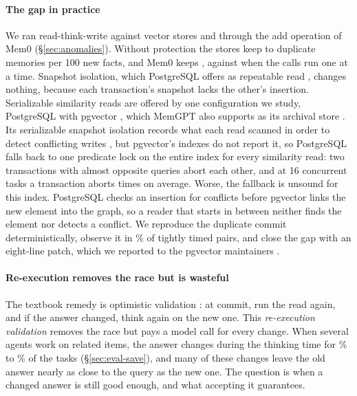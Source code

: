 \documentclass[sigconf, nonacm, review]{acmart}
\begin{document}
\paragraph{The gap in practice}
We ran read-think-write against  vector stores and
through the add operation of Mem0 (\S\ref{sec:anomalies}). Without
protection the stores keep  to 
duplicate memories per 100 new facts, and Mem0 keeps
, against  when the calls
run one at a time. Snapshot isolation, which PostgreSQL offers as repeatable read
\cite{DBLP:journals/pvldb/PortsG12}, changes nothing, because each
transaction's snapshot lacks the other's insertion. Serializable
similarity reads are offered by one configuration we study,
PostgreSQL with pgvector \cite{pgvector}, which MemGPT also
supports as its archival store \cite{DBLP:journals/corr/abs-2310-08560}. Its
serializable snapshot isolation records what each read scanned in order
to detect conflicting writes
\cite{DBLP:conf/sigmod/CahillRF08,DBLP:journals/pvldb/PortsG12}, but
pgvector's indexes do not report it, so PostgreSQL falls back to one
predicate lock on the entire index for every similarity read: two
transactions with almost opposite queries abort each other, and at
16 concurrent tasks a transaction aborts  times on average. Worse, the
fallback is unsound for this index. PostgreSQL checks an insertion for
conflicts before pgvector links the new element into the graph, so a
reader that starts in between neither finds the element nor detects
a conflict. We reproduce the duplicate commit deterministically,
observe it in \% of tightly timed pairs, and close
the gap with an eight-line patch, which we reported to the pgvector
maintainers \cite{pgvectorissue}.

\paragraph{Re-execution removes the race but is wasteful}
The textbook remedy is optimistic validation
\cite{DBLP:journals/tods/KungR81}: at commit, run the read again, and
if the answer changed, think again on the new one. This
\emph{re-execution validation} removes the race but pays a model call
for every change. When several agents work on related items, the
answer changes during the thinking time for \% to
\% of the tasks (\S\ref{sec:eval-save}), and many of
these changes leave the old answer nearly as close to the query as the
new one. The question is when a changed answer is still good enough,
and what accepting it guarantees.
\end{document}
